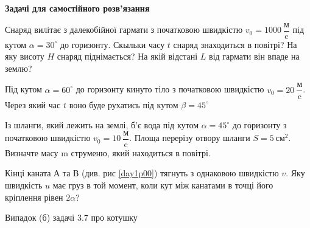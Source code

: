 \textbf{Задачі для самостійного розв'язання}

\begin{problem}{4}
	Снаряд вилітає з далекобійної гармати з початковою швидкістю $v_0 = 1000~\dfrac{\text{м}}{\text{c}}$ під кутом $\alpha = 30^{\circ}$ до горизонту. Скыльки часу $t$ снаряд знаходиться в повітрі? На яку висоту $H$ снаряд піднімається? На якій відстані $L$ від гармати він впаде на землю?
\end{problem}

\begin{problem}{5}
	Під кутом $\alpha = 60^{\circ}$ до горизонту кинуто тіло з початковою швидкістю $v_0 = 20~\dfrac{\text{м}}{\text{c}}$. Через який час $t$ воно буде рухатись під кутом $\beta = 45^{\circ}$
\end{problem}

\begin{problem}{6}
	Із шланги, який лежить на землі, б'є вода під кутом $\alpha = 45^{\circ}$ до горизонту з початковою швидкістю $v_0 = 10~\dfrac{\text{м}}{\text{c}}$. Площа перерізу отвору шланги $S = 5 ~\text{см}^2$. Визначте масу m струменю, який находиться в повітрі.
\end{problem}

\begin{problem}{8}
	Кінці каната А та В (див. рис \ref{day1p00}) тягнуть з однаковою швидкістю $v$. Яку швидкість $u$ має груз в той момент, коли кут між канатами в точці його кріплення рівен $2\alpha$?
	
\end{problem}

\begin{problem}{9}
	Випадок (б) задачі 3.7 про котушку
\end{problem}